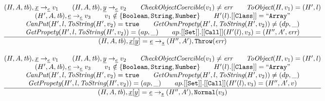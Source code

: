 \[\begin{array}{l@{~~}l@{~~}ll}
\frac{\begin{matrix}
\evale, \irid \rightarrow_{\ir\expr} v_1
\rulesep
\evale, \ir{y} \rightarrow_{\ir\expr} v_2
\rulesep
\hf{CheckObjectCoercible}(v_1) \not= \err
\rulesep
\hf{ToObject}(H, v_1) = (H',l)
\\
(H', A, \tb), \irexpr \rightarrow_{\ir\expr} v_3
\rulesep
v_1 \notin \{{\tt Boolean, String, Number}\}
\rulesep
H'(l).[[{\tt Class}]] = {\tt``Array"}%
\\
\hf{CanPut}(H', l, \hf{ToString}(H', v_2) = \true
\rulesep
\hf{GetOwnPropety}(H', l,\hf{ToString}(H', v_2)) \not= (dp, \_)
\\
\hf{GetPropety}(H', l,\hf{ToString}(H', v_2)) = (ap, \_)
\rulesep
ap.{\tt[[Set]]}.{\tt[[Call]]}(H'(l), v_3) = (H'', A', \err)
\end{matrix}}{\begin{matrix}
\state, \irid{\tt[}\ir{y}{\tt] =} \ \irexpr \rightarrow_{\ir\stmt}
(H'',A'), {\tt Throw}(\err)
\end{matrix}}
\\[2em]


\frac{\begin{matrix}
\evale, \irid \rightarrow_{\ir\expr} v_1
\rulesep
\evale, \ir{y} \rightarrow_{\ir\expr} v_2
\rulesep
\hf{CheckObjectCoercible}(v_1) \not= \err
\rulesep
\hf{ToObject}(H, v_1) = (H',l)
\\
(H', A, \tb), \irexpr \rightarrow_{\ir\expr} v_3
\rulesep
v_1 \notin \{{\tt Boolean, String, Number}\}
\rulesep
H'(l).[[{\tt Class}]] = {\tt``Array"}%
\\
\hf{CanPut}(H', l, \hf{ToString}(H', v_2) = \true
\rulesep
\hf{GetOwnPropety}(H', l,\hf{ToString}(H', v_2)) \not= (dp, \_)
\\
\hf{GetPropety}(H', l,\hf{ToString}(H', v_2)) = (ap, \_)
\rulesep
ap.{\tt[[Set]]}.{\tt[[Call]]}(H'(l), v_3) = (H'', A', v)
\end{matrix}}{\begin{matrix}
\state, \irid{\tt[}\ir{y}{\tt] =} \ \irexpr \rightarrow_{\ir\stmt}
(H'',A'), {\tt Normal}(v_3)
\end{matrix}}
\\[2em]



\end{array}\]
